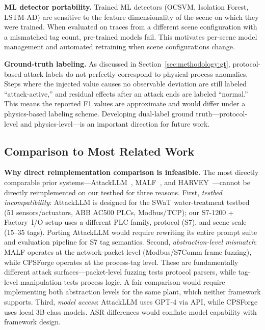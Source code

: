 \textbf{ML detector portability.} Trained ML detectors (OCSVM, Isolation Forest, LSTM-AD) are sensitive to the feature dimensionality of the scene on which they were trained. When evaluated on traces from a different scene configuration with a mismatched tag count, pre-trained models fail. This motivates per-scene model management and automated retraining when scene configurations change.

\textbf{Ground-truth labeling.} As discussed in Section~\ref{sec:methodology:gt}, protocol-based attack labels do not perfectly correspond to physical-process anomalies. Steps where the injected value causes no observable deviation are still labeled ``attack-active,'' and residual effects after an attack ends are labeled ``normal.'' This means the reported F1 values are approximate and would differ under a physics-based labeling scheme. Developing dual-label ground truth---protocol-level and physics-level---is an important direction for future work.

\subsection{Comparison to Most Related Work}

\textbf{Why direct reimplementation comparison is infeasible.} The most directly comparable prior systems---AttackLLM~\cite{ahmed2025attackllm}, MALF~\cite{ning2025malf}, and HARVEY~\cite{garcia2017harvey}---cannot be directly reimplemented on our testbed for three reasons. First, \emph{testbed incompatibility}: AttackLLM is designed for the SWaT water-treatment testbed (51 sensors/actuators, ABB AC500 PLCs, Modbus/TCP); our S7-1200 + Factory~I/O setup uses a different PLC family, protocol (S7), and scene scale (15--35 tags). Porting AttackLLM would require rewriting its entire prompt suite and evaluation pipeline for S7 tag semantics. Second, \emph{abstraction-level mismatch}: MALF operates at the network-packet level (Modbus/S7Comm frame fuzzing), while CPSForge operates at the process-tag level. These are fundamentally different attack surfaces---packet-level fuzzing tests protocol parsers, while tag-level manipulation tests process logic. A fair comparison would require implementing both abstraction levels for the same plant, which neither framework supports. Third, \emph{model access}: AttackLLM uses GPT-4 via API, while CPSForge uses local 3B-class models. ASR differences would conflate model capability with framework design.

